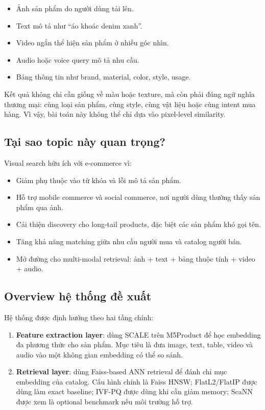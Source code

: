 \documentclass[12pt,a4paper]{article}
\begin{document}
\begin{itemize}
  \item Ảnh sản phẩm do người dùng tải lên.
  \item Text mô tả như ``áo khoác denim xanh''.
  \item Video ngắn thể hiện sản phẩm ở nhiều góc nhìn.
  \item Audio hoặc voice query mô tả nhu cầu.
  \item Bảng thông tin như brand, material, color, style, usage.
\end{itemize}

Kết quả không chỉ cần giống về màu hoặc texture, mà còn phải đúng ngữ nghĩa thương mại: cùng loại sản phẩm, cùng style, cùng vật liệu hoặc cùng intent mua hàng. Vì vậy, bài toán này không thể chỉ dựa vào pixel-level similarity.

\subsection{Tại sao topic này quan trọng?}
Visual search hữu ích với e-commerce vì:
\begin{itemize}
  \item Giảm phụ thuộc vào từ khóa và lỗi mô tả sản phẩm.
  \item Hỗ trợ mobile commerce và social commerce, nơi người dùng thường thấy sản phẩm qua ảnh.
  \item Cải thiện discovery cho long-tail products, đặc biệt các sản phẩm khó gọi tên.
  \item Tăng khả năng matching giữa nhu cầu người mua và catalog người bán.
  \item Mở đường cho multi-modal retrieval: ảnh + text + bảng thuộc tính + video + audio.
\end{itemize}

\subsection{Overview hệ thống đề xuất}
Hệ thống được định hướng theo hai tầng chính:

\begin{enumerate}
  \item \textbf{Feature extraction layer}: dùng SCALE trên M5Product để học embedding đa phương thức cho sản phẩm. Mục tiêu là đưa image, text, table, video và audio vào một không gian embedding có thể so sánh.
  \item \textbf{Retrieval layer}: dùng Faiss-based ANN retrieval để đánh chỉ mục embedding của catalog. Cấu hình chính là Faiss HNSW; FlatL2/FlatIP được dùng làm exact baseline; IVF-PQ được dùng khi cần giảm memory; ScaNN được xem là optional benchmark nếu môi trường hỗ trợ.
\end{enumerate}
\end{document}
